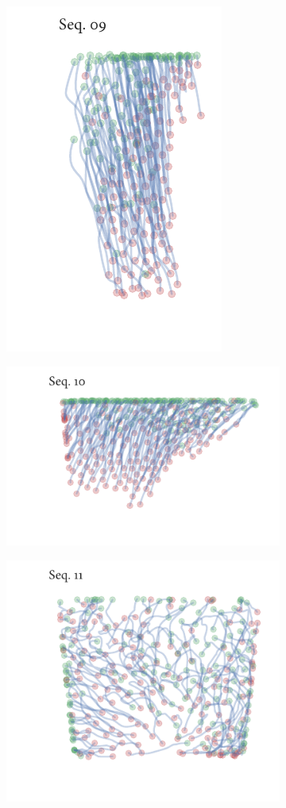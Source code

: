 \begin{figure}[h]
\begin{subfigure}[t]{0.5\textwidth}
		\centering
		\includegraphics{sequence09.pdf}
	\end{subfigure}%
	\begin{subfigure}[t]{0.5\textwidth}
		\centering
		\includegraphics{sequence10.pdf}
	\end{subfigure}
	\begin{subfigure}[t]{0.5\textwidth}
		\centering
		\includegraphics{sequence11.pdf}

\end{subfigure}
\end{figure}
